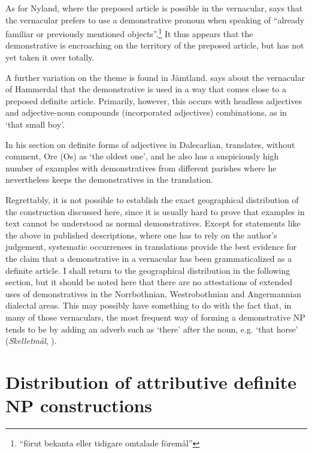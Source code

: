 As for Nyland, where the preposed article is possible in the vernacular, \citet[21]{Lundström1939} says that the vernacular prefers to use a demonstrative pronoun when speaking of “already familiar or previously mentioned objects”.\footnote{ “förut bekanta eller tidigare omtalade föremål”} It thus appears that the demonstrative is encroaching on the territory of the preposed article, but has not yet taken it over totally. 

A further variation on the theme is found in Jämtland. \citet[38]{Reinhammar2005} says about the vernacular of Hammerdal that the demonstrative is used in a way that comes close to a preposed definite article. Primarily, however, this occurs with headless adjectives and adjective-noun compounds (incorporated adjectives) combinations, as in ‘that small boy’. 

In his section on definite forms of adjectives in Dalecarlian, \citet[147]{Levander1928} translates, without comment, Ore (Os)  as ‘the oldest one’, and he also has a suspiciously high number of examples with demonstratives from different parishes where he nevertheless keeps the demonstratives in the translation. 

Regrettably, it is not possible to establish the exact geographical distribution of the construction discussed here, since it is usually hard to prove that examples in text cannot be understood as normal demonstratives. Except for statements like the above in published descriptions, where one has to rely on the author’s judgement, systematic occurrences in translations provide the best evidence for the claim that a demonstrative in a vernacular has been grammaticalized as a definite article. I shall return to the geographical distribution in the following section, but it should be noted here that there are no attestations of extended uses of demonstratives in the Norrbothnian, Westrobothnian and Angermannian dialectal areas. This may possibly have something to do with the fact that, in many of those vernaculars, the most frequent way of forming a demonstrative NP tends to be by adding an adverb such as  ‘there’ after the noun, e.g.  ‘that horse’ (\textit{Skelletmål}, \citet[41]{Marklund1976}).

\section{Distribution of attributive definite NP constructions}
\label{sec:4.4}

